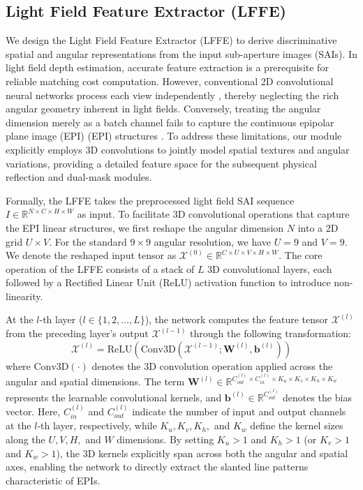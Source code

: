 \subsection{Light Field Feature Extractor (LFFE)}

We design the Light Field Feature Extractor (LFFE) to derive discriminative spatial and angular representations from the input sub-aperture images (SAIs). In light field depth estimation, accurate feature extraction is a prerequisite for reliable matching cost computation. However, conventional 2D convolutional neural networks process each view independently , thereby neglecting the rich angular geometry inherent in light fields. Conversely, treating the angular dimension merely as a batch channel fails to capture the continuous epipolar plane image (EPI) (EPI) structures . To address these limitations, our module explicitly employs 3D convolutions to jointly model spatial textures and angular variations, providing a detailed feature space for the subsequent physical reflection and dual-mask modules.

Formally, the LFFE takes the preprocessed light field SAI sequence $I \in \mathbb{R}^{N \times C \times H \times W}$ as input. To facilitate 3D convolutional operations that capture the EPI linear structures, we first reshape the angular dimension $N$ into a 2D grid $U \times V$. For the standard $9 \times 9$ angular resolution, we have $U=9$ and $V=9$. We denote the reshaped input tensor as $\mathcal{X}^{(0)} \in \mathbb{R}^{C \times U \times V \times H \times W}$. The core operation of the LFFE consists of a stack of $L$ 3D convolutional layers, each followed by a Rectified Linear Unit (ReLU) activation function to introduce non-linearity. 

At the $l$-th layer ($l \in \{1, 2, \dots, L\}$), the network computes the feature tensor $\mathcal{X}^{(l)}$ from the preceding layer's output $\mathcal{X}^{(l-1)}$ through the following transformation:
\begin{equation}
\label{eq:eq20}
\mathcal{X}^{(l)} = \text{ReLU}\left( \text{Conv3D}\left(\mathcal{X}^{(l-1)}; \mathbf{W}^{(l)}, \mathbf{b}^{(l)}\right) \right)
\end{equation}
where $\text{Conv3D}(\cdot)$ denotes the 3D convolution operation applied across the angular and spatial dimensions. The term $\mathbf{W}^{(l)} \in \mathbb{R}^{C_{out}^{(l)} \times C_{in}^{(l)} \times K_u \times K_v \times K_h \times K_w}$ represents the learnable convolutional kernels, and $\mathbf{b}^{(l)} \in \mathbb{R}^{C_{out}^{(l)}}$ denotes the bias vector. Here, $C_{in}^{(l)}$ and $C_{out}^{(l)}$ indicate the number of input and output channels at the $l$-th layer, respectively, while $K_u, K_v, K_h,$ and $K_w$ define the kernel sizes along the $U, V, H,$ and $W$ dimensions. By setting $K_u > 1$ and $K_h > 1$ (or $K_v > 1$ and $K_w > 1$), the 3D kernels explicitly span across both the angular and spatial axes, enabling the network to directly extract the slanted line patterns characteristic of EPIs.

